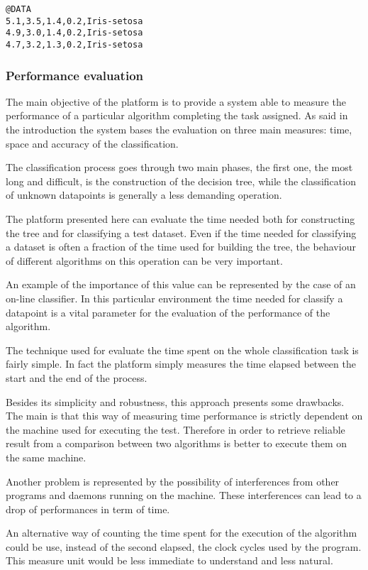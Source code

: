\documentclass{acm_proc_article-sp-sigmod07}
\begin{document}
\begin{verbatim}
@DATA
5.1,3.5,1.4,0.2,Iris-setosa
4.9,3.0,1.4,0.2,Iris-setosa
4.7,3.2,1.3,0.2,Iris-setosa
\end{verbatim}

\subsubsection{Performance evaluation}
The main objective of the platform is to provide a system able to measure
the performance of a particular algorithm completing the task assigned.
As said in the introduction the system bases the evaluation on three main
measures: time, space and accuracy of the classification.

The classification process goes through two main phases, the first one,
the most long and difficult, is the construction of the decision tree,
while the classification of unknown datapoints is generally a less
demanding operation.

The platform presented here can evaluate the time needed both for
constructing the tree and for classifying a test dataset. 
Even if the time needed for classifying a dataset is often a fraction of
the time used for building the tree, the behaviour of different algorithms
on this operation can be very important.

An example of the importance of this value can be represented by the case
of an on-line classifier. In this particular environment the time needed
for classify a datapoint is a vital parameter for the evaluation of the
performance of the algorithm.

The technique used for evaluate the time spent on the whole classification
task is fairly simple. In fact the platform simply measures the time
elapsed between the start and the end of the process.

Besides its simplicity and robustness, this approach presents some
drawbacks. The main is that this way of measuring time performance is
strictly dependent on the machine used for executing the test.
Therefore in order to retrieve reliable result from a comparison between
two algorithms is better to execute them on the same machine.

Another problem is represented by the possibility of interferences from
other programs and daemons running on the machine. These interferences can
lead to a drop of performances in term of time.

An alternative way of counting the time spent for the execution of the
algorithm could be use, instead of the second elapsed, the clock cycles
used by the program. 
This measure unit would be less immediate to understand and less natural.
\end{document}
